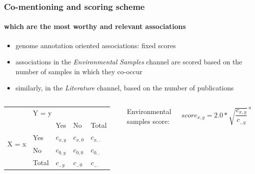 \documentclass{beamer}
\begin{document}
   \begin{frame}
      \frametitle{Co-mentioning and scoring scheme }
      \framesubtitle{which are the most worthy and relevant associations}

      \small
      \begin{itemize}
         \item genome annotation oriented associations: fixed scores
         \item associations in the \textit{Environmental Samples} channel are scored based on the number of samples in which they co-occur
         \item similarly, in the \textit{Literature} channel, based on the number of publications
      \end{itemize}
 
      \begin{columns}[onlytextwidth]
            \begin{table}[ht]
               \begin{tabular}{c|llll}
                & \multicolumn{4}{l}{Y = y} \\ \cline{2-5} 
               \multirow{4}{*}{X = x} &  & Yes & No & Total \\ \cline{3-5} 
                & \multicolumn{1}{l|}{Yes} & $c_{x,y}$ & $c_{x,0}$ & $c_{x,.}$ \\
                & \multicolumn{1}{l|}{No} & $c_{0,y}$ & $c_{0,0}$ & $c_{0,.}$ \\
                & \multicolumn{1}{l|}{Total} & $c_{.,y}$ & $c_{.,0}$ & $c_{.,.}$
               \end{tabular}
            \end{table}

               Environmental samples score: 

                  \begin{equation}
                     score_{x,y} = 2.0*\sqrt{\frac{c_{x,y}}{c_{.,y}}}^{ \:a}
                  \end{equation}


\end{columns}
\end{frame}
\end{document}
